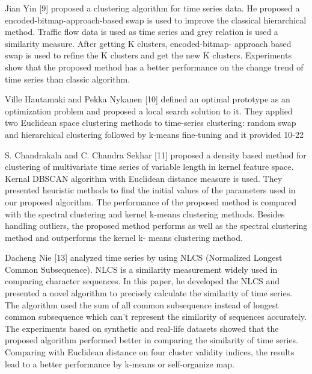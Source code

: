 Jian Yin [9] proposed a clustering algorithm for time series data. He proposed a encoded-bitmap-approach-based swap is used  to  improve  the  classical  hierarchical  method.  Traffic flow data is used as time series and grey relation is used a similarity measure. After getting K clusters, encoded-bitmap- approach based swap is used to refine the K clusters and get the new K clusters. Experiments show that the proposed method has a better performance on the change trend of time series than classic algorithm.

Ville Hautamaki and Pekka Nykanen [10] defined an optimal prototype as an optimization problem and proposed a local search solution to it. They applied two Euclidean space clustering methods to time-series clustering: random swap and hierarchical clustering followed by k-means fine-tuning and it provided 10-22%

S.  Chandrakala  and  C.  Chandra  Sekhar  [11]  proposed  a density based method for clustering of multivariate time series of variable length in kernel feature space.  Kernal DBSCAN algorithm with Euclidean distance measure is used. They presented heuristic methods to find the initial values of the parameters used in our proposed algorithm. The performance of the proposed method is compared with the spectral clustering and kernel k-means clustering methods. Besides handling outliers, the proposed method performs as well as the spectral clustering method and outperforms the kernel k- means clustering method.

Dacheng Nie [13] analyzed time series by using NLCS (Normalized Longest Common Subsequence). NLCS is a similarity measurement widely used in comparing character sequences.  In  this  paper,  he  developed  the  NLCS  and presented   a   novel   algorithm   to   precisely   calculate   the similarity of time series. The algorithm used the sum of all common  subsequence  instead  of  longest  common subsequence which can’t represent the similarity of sequences accurately. The experiments based on synthetic and real-life datasets showed that the proposed algorithm performed better in comparing the similarity of time series. Comparing with Euclidean distance on four cluster validity indices, the results lead to a better performance by k-means or self-organize map. 


